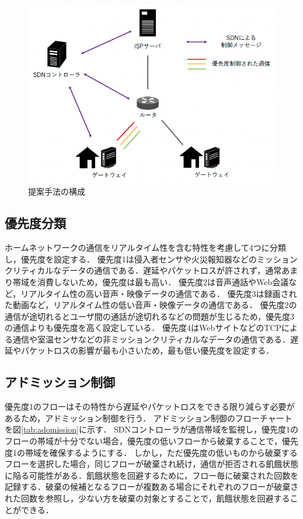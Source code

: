 \documentclass[a4paper,10pt,twocolumn,uplatex]{jsarticle}
\begin{document}
\begin{figure}[t]
	\begin{centering}
    \includegraphics[width=\linewidth]{img/proposal.png}
    \caption{提案手法の構成}
    \label{tab:proposal}
    \end{centering}
\end{figure}

\subsection{優先度分類}
ホームネットワークの通信をリアルタイム性を含む特性を考慮して4つに分類し，優先度を設定する．
優先度1は侵入者センサや火災報知器などのミッションクリティカルなデータの通信である．遅延やパケットロスが許されず，通常あまり帯域を消費しないため，優先度は最も高い．
優先度2は音声通話やWeb会議など，リアルタイム性の高い音声・映像データの通信である．
優先度3は録画された動画など，リアルタイム性の低い音声・映像データの通信である．
優先度2の通信が途切れるとユーザ間の通話が途切れるなどの問題が生じるため，優先度3の通信よりも優先度を高く設定している．
優先度4はWebサイトなどのTCPによる通信や室温センサなどの非ミッションクリティカルなデータの通信である．遅延やパケットロスの影響が最も小さいため，最も低い優先度を設定する．\par

\subsection{アドミッション制御}
優先度1のフローはその特性から遅延やパケットロスをできる限り減らす必要があるため，アドミッション制御を行う．
アドミッション制御のフローチャートを図\ref{tab:adomission}に示す．
SDNコントローラが通信帯域を監視し，優先度1のフローの帯域が十分でない場合，優先度の低いフローから破棄することで，優先度1の帯域を確保するようにする．
しかし，ただ優先度の低いものから破棄するフローを選択した場合，同じフローが破棄され続け，通信が拒否される飢餓状態に陥る可能性がある．飢餓状態を回避するために，フロー毎に破棄された回数を記録する．破棄の候補となるフローが複数ある場合にそれぞれのフローが破棄された回数を参照し，少ない方を破棄の対象とすることで，飢餓状態を回避することができる．
\end{document}

